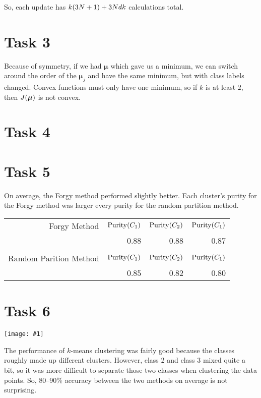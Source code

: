 \documentclass{article}
\newcommand{\image}[2]{\begin{center}\texttt{[image: \#1]}\end{center}}
\renewcommand{\vec}[1]{\boldsymbol{#1}}
\DeclarePairedDelimiter{\p}{(}{)}
\DeclareMathOperator{\purity}{Purity}
\begin{document}
So, each update has $k\p{3N + 1} + 3Ndk$ calculations total.

\section*{Task 3}
Because of symmetry, if we had $\vec{\mu}$ which gave us a minimum, we can switch around the order of the $\vec{\mu}_j$ and have the same minimum, but with class labels changed. Convex functions must only have one minimum, so if $k$ is at least $2$, then $J\p{\vec{\mu}}$ is not convex.

\pagebreak
\section*{Task 4}


\section*{Task 5}
On average, the Forgy method performed slightly better. Each cluster's purity for the Forgy method was larger every purity for the random partition method. 
\begin{center}
	\renewcommand{\arraystretch}{1.25}
	\begin{tabular}{r|rrr}
		Forgy Method & $\purity\p{C_1}$ & $\purity\p{C_2}$ & $\purity\p{C_1}$ \\
		& 0.88 & 0.88 & 0.87 \\ \\
		Random Parition Method & $\purity\p{C_1}$ & $\purity\p{C_2}$ & $\purity\p{C_1}$ \\
		& 0.85 & 0.82 & 0.80
	\end{tabular}
\end{center}

\section*{Task 6}
\image{images/projection.png}{1}
The performance of $k$-means clustering was fairly good because the classes roughly made up different clusters. However, class 2 and class 3 mixed quite a bit, so it was more difficult to separate those two classes when clustering the data points. So, 80--90\% accuracy between the two methods on average is not surprising.
\end{document}

